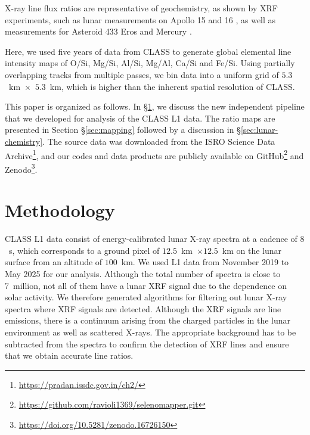 \documentclass[twocolumn,linenumbers]{aastex631}
\begin{document}
X-ray line flux ratios are representative of geochemistry, as shown by XRF experiments, such as lunar measurements on Apollo 15 \citep{1972Sci...175..436A} and 16 \citep{adler1972}, as well as measurements for Asteroid 433 Eros \citep{2009Icar..200..129L} and Mercury \citep{weider2015, 2020Icar..34513716N}.

Here, we used five years of data from CLASS to generate global elemental line intensity maps of O/Si, Mg/Si, Al/Si, Mg/Al, Ca/Si and Fe/Si. Using partially overlapping tracks from multiple passes, we bin data into a uniform grid of $5.3$~km~$\times$~$5.3$~km, which is higher than the inherent spatial resolution of CLASS.

This paper is organized as follows. In \S\ref{sec:methodolgy}, we discuss the new independent pipeline that we developed for analysis of the CLASS L1 data.
The ratio maps are presented in Section \S\ref{sec:mapping} followed by a discussion in \S\ref{sec:lunar-chemistry}. 
The source data was downloaded from the ISRO Science Data Archive\footnote{\url{https://pradan.issdc.gov.in/ch2/}}, and our codes and data products are publicly available on GitHub\footnote{\url{https://github.com/ravioli1369/selenomapper.git}} and Zenodo\footnote{\url{https://doi.org/10.5281/zenodo.16726150}}.

\section{Methodology}\label{sec:methodolgy}

CLASS L1 data consist of energy-calibrated lunar X-ray spectra at a cadence of $8$~s, which corresponds to a ground pixel of $12.5$~km~$\times 12.5$~km on the lunar surface from an altitude of $100$~km. We used L1 data from November 2019 to May 2025 for our analysis. Although the total number of spectra is close to 7~million, not all of them have a lunar XRF signal due to the dependence on solar activity. We therefore generated algorithms for filtering out lunar X-ray spectra where XRF signals are detected. Although the XRF signals are line emissions, there is a continuum arising from the charged particles in the lunar environment as well as scattered X-rays. The appropriate background has to be subtracted from the spectra to confirm the detection of XRF lines and ensure that we obtain accurate line ratios.
\end{document}
